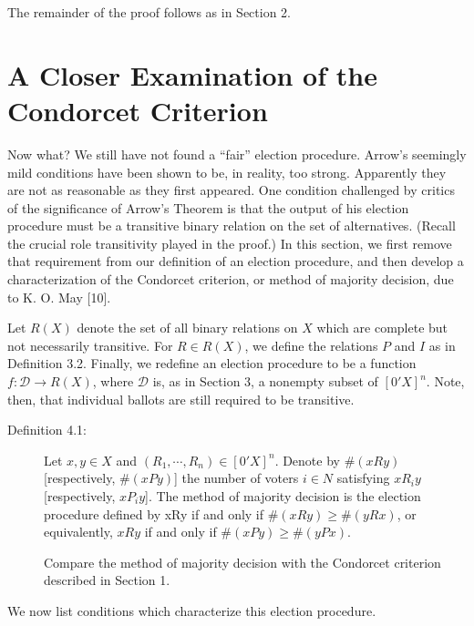 \documentclass{article}
\begin{document}
The remainder of the proof follows as in Section 2.



\section{A Closer Examination of the Condorcet Criterion}

Now what? We still have not found a ``fair'' election procedure. Arrow's seemingly mild conditions have been shown to be, in reality, too strong. Apparently they are not as reasonable as they first appeared. One condition challenged by critics of the significance of Arrow's Theorem is that the output of his election procedure must be a transitive binary relation on the set of alternatives. (Recall the crucial role transitivity played in the proof.) In this section, we first remove that requirement from our definition of an election procedure, and then develop a characterization of the Condorcet criterion, or method of majority decision, due to K. O. May [10].

Let $R(X)$ denote the set of all binary relations on $X$ which are complete but not necessarily transitive. For $R \in R(X)$, we define the relations $P$ and $I$ as in Definition 3.2. Finally, we redefine an election procedure to be a function $f: \mathcal{D} \rightarrow R(X)$, where $\mathcal{D}$ is, as in Section 3, a nonempty subset of $[0'X]^{n}$. Note, then, that individual ballots are still required to be transitive.

\begin{description}


\item[Definition 4.1:] Let $x,y \in X$ and $(R_{1},\cdots,R_{n}) \in [0'X]^{n}$. Denote by $\#(xRy)$ [respectively, $\#(xPy)$] the number of voters $i \in N$ satisfying $xR_{i}y$ [respectively, $xP_{i}y$]. The method of majority decision is the election procedure defined by xRy if and only if $\#(xRy) \geq \#(yRx)$, or equivalently, $xRy$ if and only if $\#(xPy) \geq \#(yPx)$.

  Compare the method of majority decision with the Condorcet criterion described in Section 1.

\end{description}

We now list conditions which characterize this election procedure.
\end{document}

